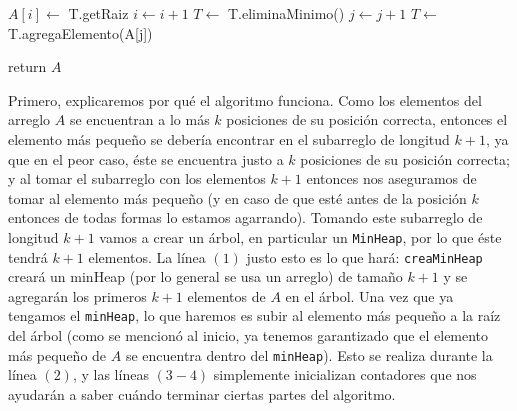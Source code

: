 \documentclass[letterpaper,11pt]{article}
\begin{document}
\begin{enumerate}
\begin{center}
\begin{minipage}[c]{0.75\textwidth}
\begin{algorithm}[H]
\begin{algorithmic}[1]
                    \State $A[i] \gets$ T.getRaiz
                    \State $i \gets i + 1$
                    \State $T \gets$ T.eliminaMinimo()
                        \State $j \gets j +1$
                        \State $T \gets$ T.agregaElemento(A[j])
                    \EndIf
                \EndWhile

                \State return $A$
            \end{algorithmic} 
        \end{algorithm}
        \end{minipage}
    \end{center}

    Primero, explicaremos por qué el algoritmo funciona. Como los elementos del 
    arreglo $A$ se encuentran a lo más $k$ posiciones de su posición correcta,
    entonces el elemento más pequeño se debería encontrar en el subarreglo 
    de longitud $k+1$, ya que en el peor caso, éste se encuentra justo a $k$ 
    posiciones de su posición correcta; y al tomar el subarreglo con los 
    elementos $k+1$ entonces nos aseguramos de tomar al elemento más pequeño
    (y en caso de que esté antes de la posición $k$ entonces de todas formas 
    lo estamos agarrando). Tomando este subarreglo de longitud $k+1$ vamos a 
    crear un árbol, en particular un \texttt{MinHeap}, por lo que éste tendrá 
    $k+1$ elementos. La línea $(1)$ justo esto es lo que hará: 
    \texttt{creaMinHeap} creará un minHeap (por lo general se usa un arreglo) de 
    tamaño $k+1$ y se agregarán los primeros $k+1$ elementos de $A$ en el árbol.
    Una vez que ya tengamos el \texttt{minHeap}, lo que haremos es subir al 
    elemento más pequeño a la raíz del árbol (como se mencionó al inicio, ya 
    tenemos garantizado que el elemento más pequeño de $A$ se encuentra dentro 
    del \texttt{minHeap}). Esto se realiza durante la línea $(2)$, y las líneas 
    $(3 - 4)$ simplemente inicializan contadores que nos ayudarán a saber cuándo 
    terminar ciertas partes del algoritmo.
    

\end{enumerate}
\end{document}
